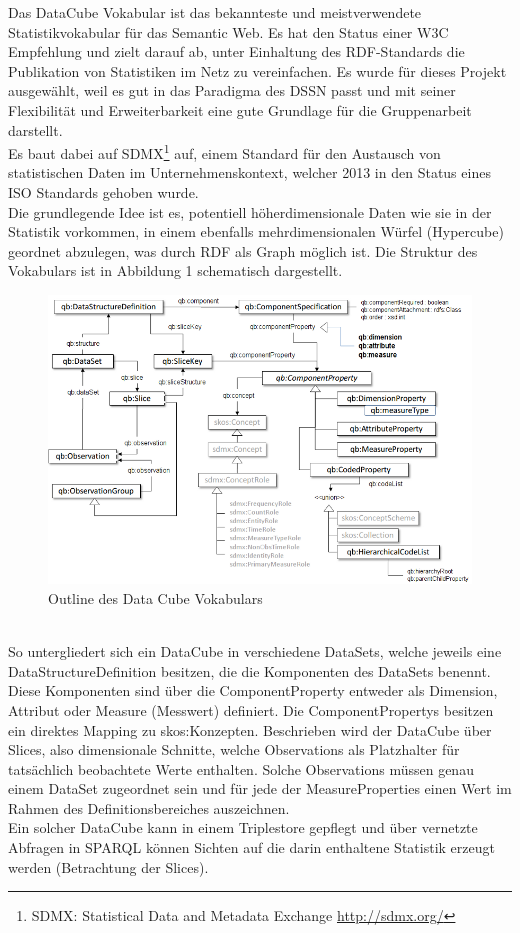 \documentclass{article}
\begin{document}
Das DataCube Vokabular ist das bekannteste und meistverwendete Statistikvokabular für das Semantic Web. Es hat den Status einer W3C Empfehlung\cite{datacube} und zielt darauf ab, unter Einhaltung des RDF-Standards die Publikation von Statistiken im Netz zu vereinfachen. Es wurde für dieses Projekt ausgewählt, weil es gut in das Paradigma des DSSN passt und mit seiner Flexibilität und Erweiterbarkeit eine gute Grundlage für die Gruppenarbeit darstellt.\\
Es baut dabei auf SDMX\footnote{SDMX: Statistical Data and Metadata Exchange \url{http://sdmx.org/}} auf, einem Standard für den Austausch von statistischen Daten im Unternehmenskontext, welcher 2013 in den Status eines ISO Standards\cite{iso} gehoben wurde.\\
Die grundlegende Idee ist es, potentiell höherdimensionale Daten wie sie in der Statistik vorkommen, in einem ebenfalls mehrdimensionalen Würfel (Hypercube) geordnet abzulegen, was durch RDF als Graph möglich ist. Die Struktur des Vokabulars ist in Abbildung 1 schematisch dargestellt.
\begin{figure}[t]
\centering
\includegraphics[width=\textwidth]{qb-fig1.png}
\caption{Outline des Data Cube Vokabulars}
\label{fig:my_label}
\end{figure}\\
So untergliedert sich ein DataCube in verschiedene DataSets, welche jeweils eine DataStructureDefinition besitzen, die die Komponenten des DataSets benennt. Diese Komponenten sind über die ComponentProperty entweder als Dimension, Attribut oder Measure (Messwert) definiert. Die ComponentPropertys besitzen ein direktes Mapping zu skos:Konzepten. Beschrieben wird der DataCube über Slices, also dimensionale Schnitte, welche Observations als Platzhalter für tatsächlich beobachtete Werte enthalten. Solche Observations müssen genau einem DataSet zugeordnet sein und für jede der MeasureProperties einen Wert im Rahmen des Definitionsbereiches auszeichnen.\\
Ein solcher DataCube kann in einem Triplestore gepflegt und über vernetzte Abfragen in SPARQL können Sichten auf die darin enthaltene Statistik erzeugt werden (Betrachtung der Slices).
\end{document}
